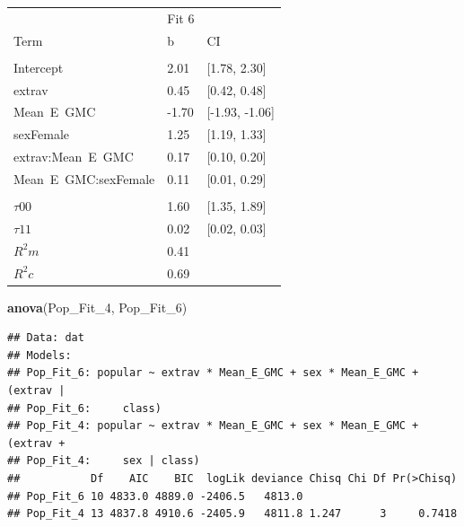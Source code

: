\documentclass[]{article}
\newenvironment{Shaded}{\begin{snugshade}}{\end{snugshade}}
\newcommand{\KeywordTok}[1]{\textcolor[rgb]{0.13,0.29,0.53}{\textbf{#1}}}
\newcommand{\DecValTok}[1]{\textcolor[rgb]{0.00,0.00,0.81}{#1}}
\newcommand{\NormalTok}[1]{#1}
\begin{document}
\begin{tabular}{lll}
\toprule
\multicolumn{1}{c}{ } & \multicolumn{1}{c}{Fit 6} \\
\cmidrule(l{2pt}r{2pt}){2-2}
Term & b & CI\\
\midrule
\addlinespace[0.3em]
\multicolumn{3}{l}{\textbf{Fixed}}\\
\hspace{1em}Intercept & 2.01 & [1.78, 2.30]\\
\hspace{1em}extrav & 0.45 & [0.42, 0.48]\\
\hspace{1em}Mean\ E\ GMC & -1.70 & [-1.93, -1.06]\\
\hspace{1em}sexFemale & 1.25 & [1.19, 1.33]\\
\hspace{1em}extrav:Mean\ E\ GMC & 0.17 & [0.10, 0.20]\\
\hspace{1em}Mean\ E\ GMC:sexFemale & 0.11 & [0.01, 0.29]\\
\addlinespace[0.3em]
\multicolumn{3}{l}{\textbf{Random}}\\
\hspace{1em}$\tau {00}$ & 1.60 & [1.35, 1.89]\\
\hspace{1em}$\tau {11}$ & 0.02 & [0.02, 0.03]\\
$R^2 m$ & 0.41 & \\
$R^2 c$ & 0.69 & \\
\bottomrule
\end{tabular}

\begin{Shaded}
\begin{Highlighting}[]
\KeywordTok{anova}\NormalTok{(Pop_Fit_}\DecValTok{4}\NormalTok{, Pop_Fit_}\DecValTok{6}\NormalTok{)}
\end{Highlighting}
\end{Shaded}

\begin{verbatim}
## Data: dat
## Models:
## Pop_Fit_6: popular ~ extrav * Mean_E_GMC + sex * Mean_E_GMC + (extrav | 
## Pop_Fit_6:     class)
## Pop_Fit_4: popular ~ extrav * Mean_E_GMC + sex * Mean_E_GMC + (extrav + 
## Pop_Fit_4:     sex | class)
##           Df    AIC    BIC  logLik deviance Chisq Chi Df Pr(>Chisq)
## Pop_Fit_6 10 4833.0 4889.0 -2406.5   4813.0                        
## Pop_Fit_4 13 4837.8 4910.6 -2405.9   4811.8 1.247      3     0.7418
\end{verbatim}
\end{document}
